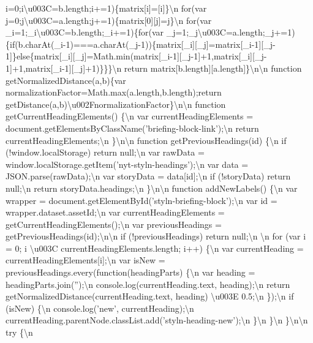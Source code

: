 i=0;i\textbackslash{}u003C=b.length;i+=1)\{matrix{[}i{]}={[}i{]}\}\textbackslash{}n
for(var
j=0;j\textbackslash{}u003C=a.length;j+=1)\{matrix{[}0{]}{[}j{]}=j\}\textbackslash{}n
for(var \_i=1;\_i\textbackslash{}u003C=b.length;\_i+=1)\{for(var
\_j=1;\_j\textbackslash{}u003C=a.length;\_j+=1)\{if(b.charAt(\_i-1)===a.charAt(\_j-1))\{matrix{[}\_i{]}{[}\_j{]}=matrix{[}\_i-1{]}{[}\_j-1{]}\}else\{matrix{[}\_i{]}{[}\_j{]}=Math.min(matrix{[}\_i-1{]}{[}\_j-1{]}+1,matrix{[}\_i{]}{[}\_j-1{]}+1,matrix{[}\_i-1{]}{[}\_j{]}+1)\}\}\}\textbackslash{}n
return
matrix{[}b.length{]}{[}a.length{]}\}\textbackslash{}n\textbackslash{}n
function getNormalizedDistance(a,b)\{var
normalizationFactor=Math.max(a.length,b.length);return
getDistance(a,b)\textbackslash{}u002FnormalizationFactor\}\textbackslash{}n\textbackslash{}n
function getCurrentHeadingElements() \{\textbackslash{}n var
currentHeadingElements =
document.getElementsByClassName('briefing-block-link');\textbackslash{}n
return currentHeadingElements;\textbackslash{}n
\}\textbackslash{}n\textbackslash{}n function getPreviousHeadings(id)
\{\textbackslash{}n if (!window.localStorage) return
null;\textbackslash{}n var rawData =
window.localStorage.getItem('nyt-styln-headings');\textbackslash{}n var
data = JSON.parse(rawData);\textbackslash{}n var storyData =
data{[}id{]};\textbackslash{}n if (!storyData) return
null;\textbackslash{}n return storyData.headings;\textbackslash{}n
\}\textbackslash{}n\textbackslash{}n function addNewLabels()
\{\textbackslash{}n var wrapper =
document.getElementById('styln-briefing-block');\textbackslash{}n var id
= wrapper.dataset.assetId;\textbackslash{}n var currentHeadingElements =
getCurrentHeadingElements();\textbackslash{}n var previousHeadings =
getPreviousHeadings(id);\textbackslash{}n\textbackslash{}n if
(!previousHeadings) return null;\textbackslash{}n \textbackslash{}n for
(var i = 0; i \textbackslash{}u003C currentHeadingElements.length; i++)
\{\textbackslash{}n var currentHeading =
currentHeadingElements{[}i{]};\textbackslash{}n var isNew =
previousHeadings.every(function(headingParts) \{\textbackslash{}n var
heading = headingParts.join('');\textbackslash{}n
console.log(currentHeading.text, heading);\textbackslash{}n return
getNormalizedDistance(currentHeading.text, heading)
\textbackslash{}u003E 0.5;\textbackslash{}n \});\textbackslash{}n if
(isNew) \{\textbackslash{}n console.log('new',
currentHeading);\textbackslash{}n
currentHeading.parentNode.classList.add('styln-heading-new');\textbackslash{}n
\}\textbackslash{}n \}\textbackslash{}n
\}\textbackslash{}n\textbackslash{}n try \{\textbackslash{}n
